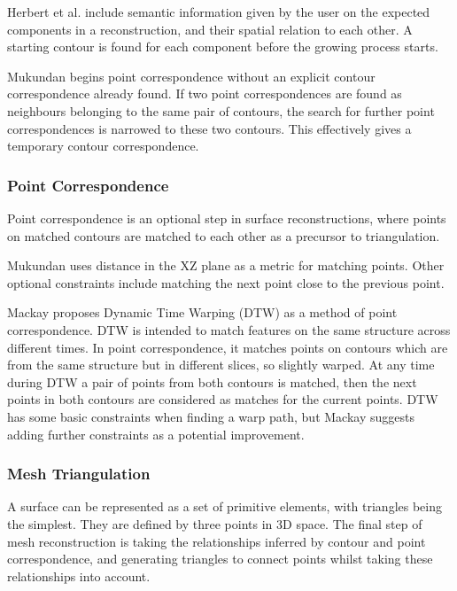 \documentclass[11p, titlepage]{article}
\begin{document}
Herbert et al. \cite{herbert2001contour} include semantic information given by the user on the expected components in a reconstruction, and their spatial relation to each other. A starting contour is found for each component before the growing process starts.

Mukundan \cite{mukundan2016reconstruction} begins point correspondence without an explicit contour correspondence already found. If two point correspondences are found as neighbours belonging to the same pair of contours, the search for further point correspondences is narrowed to these two contours. This effectively gives a temporary contour correspondence.

\subsubsection{Point Correspondence}
Point correspondence is an optional step in surface reconstructions, where points on matched contours are matched to each other as a precursor to triangulation.

Mukundan \cite{mukundan2016reconstruction} uses distance in the XZ plane as a metric for matching points. Other optional constraints include matching the next point close to the previous point.

Mackay \cite{mackay2019robust} proposes Dynamic Time Warping (DTW) as a method of point correspondence. DTW is intended to match features on the same structure across different times. In point correspondence, it matches points on contours which are from the same structure but in different slices, so slightly warped. At any time during DTW a pair of points from both contours is matched, then the next points in both contours are considered as matches for the current points. DTW has some basic constraints when finding a warp path, but Mackay suggests adding further constraints as a potential improvement.

\subsubsection{Mesh Triangulation}

A surface can be represented as a set of primitive elements, with triangles being the simplest. They are defined by three points in 3D space. The final step of mesh reconstruction is taking the relationships inferred by contour and point correspondence, and generating triangles to connect points whilst taking these relationships into account.
\end{document}
